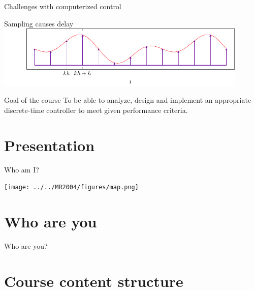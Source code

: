 \documentclass[presentation,aspectratio=169]{beamer}
\begin{document}
\begin{frame}[label=sec-1-9]{Challenges with computerized control}
\begin{block}{Sampling causes delay}
\includegraphics[width=0.9\textwidth]{../figures/modulation-model-timeseries}
\end{block}
\end{frame}


\begin{frame}[label=sec-1-10]{Goal of the course}
To be able to \alert{analyze}, \alert{design} and \alert{implement} an appropriate discrete-time controller to meet given performance criteria.
\end{frame}

\section{Presentation}
\label{sec-2}
\begin{frame}[label=sec-2-1]{Who am I?}
\begin{center}
\texttt{[image: ../../MR2004/figures/map.png]}\\
\end{center}
\end{frame}

\section{Who are you}
\label{sec-3}
\begin{frame}[label=sec-3-1]{Who are you?}
\end{frame}

\section{Course content structure}
\label{sec-4}
\end{document}
